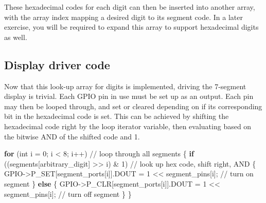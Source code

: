 \documentclass[
  9pt,
  letterpaper,
  abstract,
  titlepage]{scrbook}
\newenvironment{Shaded}{\begin{snugshade}}{\end{snugshade}}
\newcommand{\CommentTok}[1]{\textcolor[rgb]{0.37,0.37,0.37}{#1}}
\newcommand{\ControlFlowTok}[1]{\textcolor[rgb]{0.00,0.23,0.31}{\textbf{#1}}}
\newcommand{\DataTypeTok}[1]{\textcolor[rgb]{0.68,0.00,0.00}{#1}}
\newcommand{\DecValTok}[1]{\textcolor[rgb]{0.68,0.00,0.00}{#1}}
\newcommand{\NormalTok}[1]{\textcolor[rgb]{0.00,0.23,0.31}{#1}}
\newcommand{\OperatorTok}[1]{\textcolor[rgb]{0.37,0.37,0.37}{#1}}
\begin{document}
These hexadecimal codes for each digit can then be inserted into another
array, with the array index mapping a desired digit to its segment code.
In a later exercise, you will be required to expand this array to
support hexadecimal digits as well.

\subsection{Display driver code}\label{display-driver-code}

Now that this look-up array for digits is implemented, driving the
7-segment display is trivial. Each GPIO pin in use must be set up as an
output. Each pin may then be looped through, and set or cleared
depending on if its corresponding bit in the hexadecimal code is set.
This can be achieved by shifting the hexadecimal code right by the loop
iterator variable, then evaluating based on the bitwise AND of the
shifted code and 1.

\begin{Shaded}
\begin{Highlighting}[]
\ControlFlowTok{for} \OperatorTok{(}\DataTypeTok{int}\NormalTok{ i }\OperatorTok{=} \DecValTok{0}\OperatorTok{;}\NormalTok{ i }\OperatorTok{\textless{}} \DecValTok{8}\OperatorTok{;}\NormalTok{ i}\OperatorTok{++)} \CommentTok{// loop through all segments}
\OperatorTok{\{} 
    \ControlFlowTok{if} \OperatorTok{((}\NormalTok{segments}\OperatorTok{[}\NormalTok{arbitrary\_digit}\OperatorTok{]} \OperatorTok{\textgreater{}\textgreater{}}\NormalTok{ i}\OperatorTok{)} \OperatorTok{\&} \DecValTok{1}\OperatorTok{)} \CommentTok{// look up hex code, shift right, AND}
    \OperatorTok{\{}
\NormalTok{        GPIO}\OperatorTok{{-}\textgreater{}}\NormalTok{P\_SET}\OperatorTok{[}\NormalTok{segment\_ports}\OperatorTok{[}\NormalTok{i}\OperatorTok{]].}\NormalTok{DOUT }\OperatorTok{=} \DecValTok{1} \OperatorTok{\textless{}\textless{}}\NormalTok{ segment\_pins}\OperatorTok{[}\NormalTok{i}\OperatorTok{];} \CommentTok{// turn on segment}
    \OperatorTok{\}}
    \ControlFlowTok{else}
    \OperatorTok{\{}
\NormalTok{        GPIO}\OperatorTok{{-}\textgreater{}}\NormalTok{P\_CLR}\OperatorTok{[}\NormalTok{segment\_ports}\OperatorTok{[}\NormalTok{i}\OperatorTok{]].}\NormalTok{DOUT }\OperatorTok{=} \DecValTok{1} \OperatorTok{\textless{}\textless{}}\NormalTok{ segment\_pins}\OperatorTok{[}\NormalTok{i}\OperatorTok{];} \CommentTok{// turn off segment}
    \OperatorTok{\}}
\OperatorTok{\}}
\end{Highlighting}
\end{Shaded}
\end{document}
